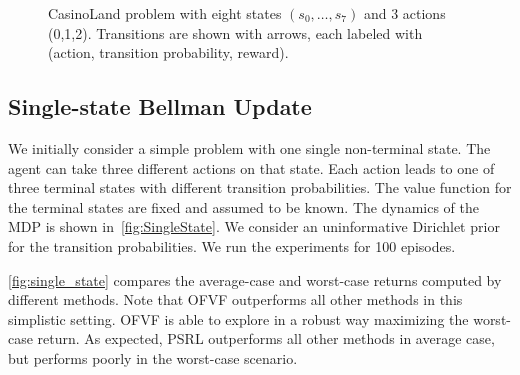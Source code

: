 \documentclass{article}
\theoremstyle{plain}
\theoremstyle{definition}
\begin{document}
\begin{figure}
\begin{center}
	\end{center}
	\caption{CasinoLand problem with eight states $(s_0,\ldots,s_7)$ and 3 actions (0,1,2). Transitions are shown with arrows, each labeled with (action, transition probability, reward).} \label{fig:CasinoLand}
\end{figure}

\subsection{Single-state Bellman Update} \label{ssection:single_state}

We initially consider a simple problem with one single non-terminal
state. The agent can take three different actions on that state. Each
action leads to one of three terminal states with different transition
probabilities. The value function for the terminal states are fixed
and assumed to be known. The dynamics of the MDP is shown
in~\cref{fig:SingleState}. We consider an uninformative Dirichlet
prior for the transition probabilities. We run the experiments for 100
episodes. 

\cref{fig:single_state} compares the average-case and worst-case returns computed by different methods. Note that OFVF outperforms all other methods in this simplistic setting. OFVF is able to explore in a robust way maximizing the worst-case return. As expected, PSRL outperforms all other methods in average case, but performs poorly in the worst-case scenario.
\end{document}
